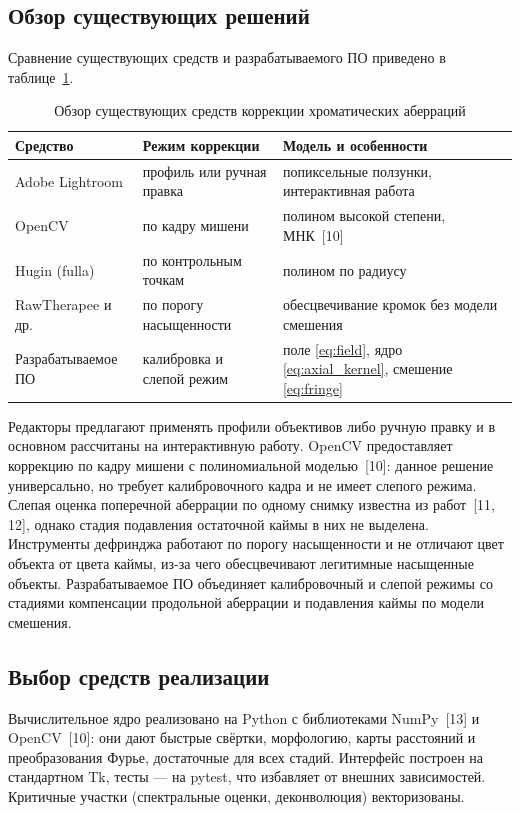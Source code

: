 \documentclass[a4paper,14pt,oneside]{extreport}
\begin{document}
\subsection{Обзор существующих решений}

Сравнение существующих средств и разрабатываемого ПО приведено в
таблице~\ref{tab:compare}.

\begin{table}[H]
\caption{Обзор существующих средств коррекции хроматических аберраций}
\label{tab:compare}
\small
\begin{tabular}{|p{3.4cm}|p{3.8cm}|p{7.6cm}|}
\hline
Средство & Режим коррекции & Модель и особенности \\
\hline
Adobe Lightroom & профиль или ручная правка & попиксельные ползунки, интерактивная работа \\
\hline
OpenCV & по кадру мишени & полином высокой степени, МНК~[10] \\
\hline
Hugin (fulla) & по контрольным точкам & полином по радиусу \\
\hline
RawTherapee и др. & по порогу насыщенности & обесцвечивание кромок без модели смешения \\
\hline
Разрабатываемое ПО & калибровка и слепой режим & поле \eqref{eq:field}, ядро \eqref{eq:axial_kernel}, смешение \eqref{eq:fringe} \\
\hline
\end{tabular}
\end{table}

Редакторы предлагают применять профили объективов либо ручную правку и в основном рассчитаны на
интерактивную работу. OpenCV предоставляет коррекцию по кадру мишени с
полиномиальной моделью~[10]: данное решение универсально, но требует калибровочного
кадра и не имеет слепого режима. Слепая оценка поперечной аберрации по
одному снимку известна из работ~[11, 12], однако стадия подавления
остаточной каймы в них не выделена. Инструменты дефринджа работают по порогу
насыщенности и не отличают цвет объекта от цвета каймы, из-за чего
обесцвечивают легитимные насыщенные объекты. Разрабатываемое ПО объединяет
калибровочный и слепой режимы со стадиями компенсации продольной аберрации и
подавления каймы по модели смешения.

\subsection{Выбор средств реализации}

Вычислительное ядро реализовано на Python с библиотеками NumPy~[13] и
OpenCV~[10]: они дают быстрые свёртки, морфологию, карты расстояний и
преобразования Фурье, достаточные для всех стадий. Интерфейс построен на
стандартном Tk, тесты --- на pytest, что избавляет от внешних зависимостей.
Критичные участки (спектральные оценки, деконволюция) векторизованы.
\end{document}
